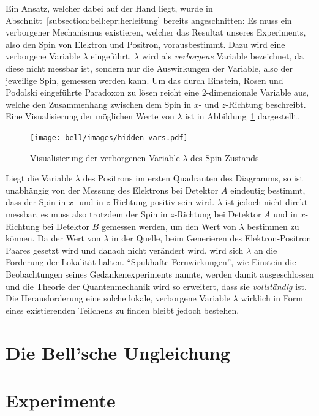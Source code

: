 \begin{refsection}
Ein Ansatz, welcher dabei auf der Hand liegt, wurde in
Abschnitt~\ref{subsection:bell:epr:herleitung} bereits angeschnitten: 
Es muss ein verborgener Mechanismus existieren, welcher das Resultat unseres
Experiments, also den Spin von Elektron und Positron, vorausbestimmt.
Dazu wird eine verborgene Variable $\lambda$ eingef\"uhrt.
$\lambda$ wird als \emph{verborgene} Variable bezeichnet, da diese nicht
messbar ist, sondern nur die Auswirkungen der Variable, also der jeweilige
Spin, gemessen werden kann.
Um das durch Einstein, Rosen und Podolski eingef\"uhrte Paradoxon zu l\"osen
reicht eine 2-dimensionale Variable aus, welche den Zusammenhang zwischen
dem Spin in $x$- und $z$-Richtung beschreibt.
Eine Visualisierung der m\"oglichen Werte von $\lambda$ ist in 
Abbildung~\ref{fig:bell:hidden_var} dargestellt.

\begin{figure}
    \centering
    \texttt{[image: bell/images/hidden\_vars.pdf]}
    \caption{Visualisierung der verborgenen Variable $\lambda$ des Spin-Zustands}
    \label{fig:bell:hidden_var}
\end{figure}

Liegt die Variable $\lambda$ des Positrons im ersten Quadranten des Diagramms,
so ist unabh\"angig von der Messung des Elektrons bei Detektor $A$ eindeutig
bestimmt, dass der Spin in $x$- und in $z$-Richtung positiv sein wird. 
$\lambda$ ist jedoch nicht direkt messbar, es muss also trotzdem der Spin
in $z$-Richtung bei Detektor $A$ und in $x$-Richtung bei Detektor $B$ gemessen
werden, um den Wert von $\lambda$ bestimmen zu k\"onnen.
Da der Wert von $\lambda$ in der Quelle, beim Generieren des Elektron-Positron
Paares gesetzt wird und danach nicht ver\"andert wird, wird sich $\lambda$
an die Forderung der Lokalit\"at halten.
\enquote{Spukhafte Fernwirkungen}, wie Einstein die Beobachtungen seines
Gedankenexperiments nannte, werden damit ausgeschlossen und die Theorie
der Quantenmechanik wird so erweitert, dass sie \emph{vollst\"andig} ist.
Die Herausforderung eine solche lokale, verborgene Variable $\lambda$ wirklich 
in Form eines existierenden Teilchens zu finden bleibt jedoch bestehen.

\section{Die Bell'sche Ungleichung}


\section{Experimente}

\end{refsection}
